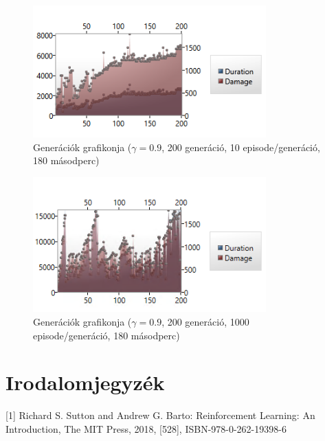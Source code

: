 \documentclass[12pt]{article}
\begin{document}
	\begin{figure}[H]
		\begin{center}
			\includegraphics[width=0.8\textwidth]{200gen10ep}
		\end{center}
		\caption{Generációk grafikonja ($\gamma = 0.9$, 200 generáció, 10 episode/generáció, 180 másodperc)}
		\label{fig:200gen10ep}
	\end{figure}
	
	\begin{figure}[H]
		\begin{center}
			\includegraphics[width=0.8\textwidth]{200gen1000ep}
		\end{center}
		\caption{Generációk grafikonja ($\gamma = 0.9$, 200 generáció, 1000 episode/generáció, 180 másodperc)}
		\label{fig:200gen1000ep}
	\end{figure}
	
	
	\pagebreak
	
	\section{Irodalomjegyzék}
	
	[1] Richard S. Sutton and Andrew G. Barto: Reinforcement Learning: An Introduction, The MIT Press, 2018, [528], ISBN-978-0-262-19398-6
	
	
\end{document}
